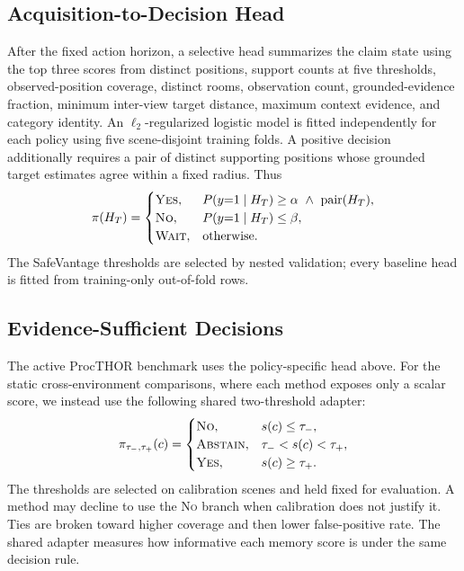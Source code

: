 \documentclass{article}
\begin{document}
\subsection{Acquisition-to-Decision Head}
After the fixed action horizon, a selective head summarizes the claim state using the top three scores from distinct positions, support counts at five thresholds, observed-position coverage, distinct rooms, observation count, grounded-evidence fraction, minimum inter-view target distance, maximum context evidence, and category identity. An $\ell_2$-regularized logistic model is fitted independently for each policy using five scene-disjoint training folds. A positive decision additionally requires a pair of distinct supporting positions whose grounded target estimates agree within a fixed radius. Thus
\begin{equation}
 \pi(H_T)=
 \begin{cases}
  \textsc{Yes}, & P(y{=}1\mid H_T)\geq\alpha \ \wedge\ \mathrm{pair}(H_T),\\
  \textsc{No}, & P(y{=}1\mid H_T)\leq\beta,\\
  \textsc{Wait}, & \text{otherwise.}
 \end{cases}
\end{equation}
The SafeVantage thresholds are selected by nested validation; every baseline head is fitted from training-only out-of-fold rows.

\subsection{Evidence-Sufficient Decisions}
The active ProcTHOR benchmark uses the policy-specific head above. For the static cross-environment comparisons, where each method exposes only a scalar score, we instead use the following shared two-threshold adapter:
\begin{equation}
\pi_{\tau_-,\tau_+}(c) =
\begin{cases}
\textsc{No}, & s(c) \le \tau_-,\\
\textsc{Abstain}, & \tau_- < s(c) < \tau_+,\\
\textsc{Yes}, & s(c) \ge \tau_+.
\end{cases}
\end{equation}
The thresholds are selected on calibration scenes and held fixed for evaluation. A method may decline to use the \textsc{No} branch when calibration does not justify it. Ties are broken toward higher coverage and then lower false-positive rate. The shared adapter measures how informative each memory score is under the same decision rule.
\end{document}
